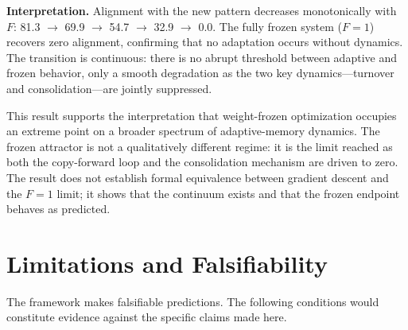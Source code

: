 \documentclass[12pt]{article}
\begin{document}
\textbf{Interpretation.} Alignment with the new pattern decreases monotonically with $F$: 81.3 $\to$ 69.9 $\to$ 54.7 $\to$ 32.9 $\to$ 0.0. The fully frozen system ($F=1$) recovers zero alignment, confirming that no adaptation occurs without dynamics. The transition is continuous: there is no abrupt threshold between adaptive and frozen behavior, only a smooth degradation as the two key dynamics---turnover and consolidation---are jointly suppressed.

This result supports the interpretation that weight-frozen optimization occupies an extreme point on a broader spectrum of adaptive-memory dynamics. The frozen attractor is not a qualitatively different regime: it is the limit reached as both the copy-forward loop and the consolidation mechanism are driven to zero. The result does not establish formal equivalence between gradient descent and the $F=1$ limit; it shows that the continuum exists and that the frozen endpoint behaves as predicted.

\section{Limitations and Falsifiability}
\label{sec:falsifiability}

The framework makes falsifiable predictions. The following conditions would constitute evidence against the specific claims made here.
\end{document}
